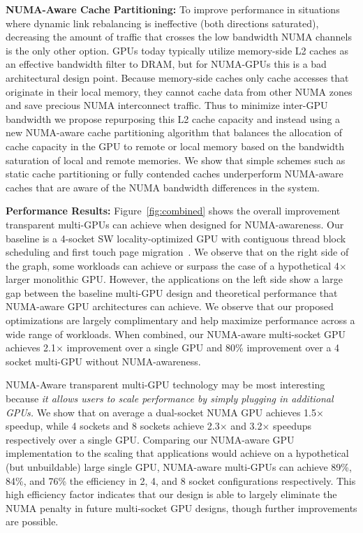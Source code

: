 \documentclass{sig-alternate}
\begin{document}
\textbf{NUMA-Aware Cache Partitioning:} To improve performance in situations 
where dynamic link rebalancing is ineffective (both directions saturated), 
decreasing the amount of traffic that crosses the low bandwidth NUMA channels is 
the only other option. GPUs today typically utilize memory-side L2 caches as an effective 
bandwidth filter to DRAM, but for NUMA-GPUs this is a bad architectural design point. 
Because memory-side caches only cache accesses that originate in their local 
memory, they cannot cache data from other NUMA zones and save precious NUMA 
interconnect traffic. Thus to minimize inter-GPU bandwidth we propose repurposing 
this L2 cache capacity and instead using a new
NUMA-aware cache partitioning algorithm that balances the allocation of cache capacity
in the GPU to remote or local memory based on the bandwidth saturation of local
and remote memories.  We show that simple schemes such as static cache partitioning
or fully contended caches underperform NUMA-aware caches that are aware of the NUMA
bandwidth differences in the system.

\textbf{Performance Results: }Figure~\ref{fig:combined} shows the overall 
improvement transparent multi-GPUs can achieve when designed for NUMA-awareness. 
Our baseline is a 4-socket SW locality-optimized GPU with contiguous 
thread block scheduling and first touch page migration~\cite{Arunkumar2017}. We 
observe that on the right side of the graph, some workloads can achieve or 
surpass the case of a hypothetical 4$\times$ larger monolithic GPU. However, the 
applications on the left side show a large gap between the baseline multi-GPU design 
and theoretical performance that NUMA-aware GPU architectures can achieve.  
We observe that our proposed optimizations are largely complimentary and help maximize 
performance across a wide range of workloads. When 
combined, our NUMA-aware multi-socket GPU achieves 2.1$\times$ improvement over a 
single GPU and 80\% improvement over a 4 socket multi-GPU without NUMA-awareness.

NUMA-Aware transparent multi-GPU technology may be most interesting because 
\textit{it allows users to scale performance by simply plugging in additional 
GPUs.} We show that on average a dual-socket NUMA GPU achieves 1.5$\times$ 
speedup, while 4 sockets and 8 sockets achieve 2.3$\times$ and 3.2$\times$ 
speedups respectively over a single GPU. Comparing our NUMA-aware GPU 
implementation to the scaling that applications would achieve on a hypothetical 
(but unbuildable) large single GPU, NUMA-aware multi-GPUs can achieve 89\%, 
84\%, and 76\% the efficiency in 2, 4, and 8 
socket configurations respectively. This high efficiency factor indicates that 
our design is able to largely eliminate the NUMA penalty in future multi-socket 
GPU designs, though further improvements are possible.
\end{document}
